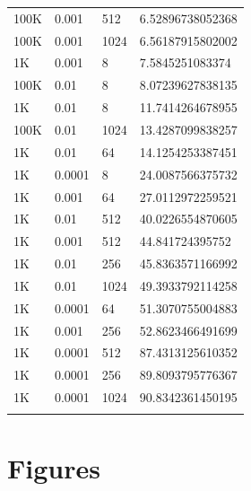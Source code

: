 \begin{table}[H]
\begin{tabular}{llll}
100K    & 0.001  & 512   & 6.52896738052368  \\ 
100K    & 0.001  & 1024  & 6.56187915802002  \\ 
1K      & 0.001  & 8     & 7.5845251083374   \\ 
100K    & 0.01   & 8     & 8.07239627838135  \\ 
1K      & 0.01   & 8     & 11.7414264678955  \\ 
100K    & 0.01   & 1024  & 13.4287099838257  \\ 
1K      & 0.01   & 64    & 14.1254253387451  \\ 
1K      & 0.0001 & 8     & 24.0087566375732  \\ 
1K      & 0.001  & 64    & 27.0112972259521  \\ 
1K      & 0.01   & 512   & 40.0226554870605  \\ 
1K      & 0.001  & 512   & 44.841724395752   \\ 
1K      & 0.01   & 256   & 45.8363571166992  \\ 
1K      & 0.01   & 1024  & 49.3933792114258  \\ 
1K      & 0.0001 & 64    & 51.3070755004883  \\ 
1K      & 0.001  & 256   & 52.8623466491699  \\ 
1K      & 0.0001 & 512   & 87.4313125610352  \\ 
1K      & 0.0001 & 256   & 89.8093795776367  \\ 
1K      & 0.0001 & 1024  & 90.8342361450195  \\ 
\bottomrule\\
\end{tabular}
\end{table}




\section{Figures}

